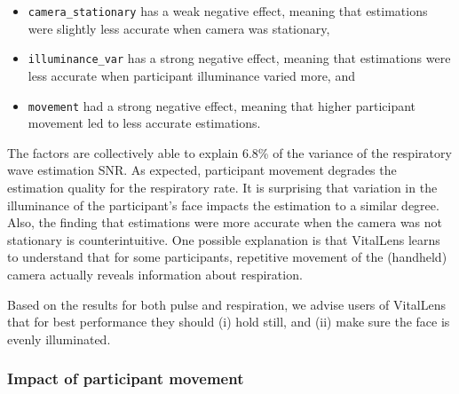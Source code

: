 \documentclass{article}
\begin{document}
\begin{itemize}
	\item \texttt{camera\_stationary} has a weak negative effect, meaning that estimations were slightly less accurate when camera was stationary,
	\item \texttt{illuminance\_var} has a strong negative effect, meaning that estimations were less accurate when participant illuminance varied more, and
	\item \texttt{movement} had a strong negative effect, meaning that higher participant movement led to less accurate estimations.
\end{itemize}

The factors are collectively able to explain 6.8\% of the variance of the respiratory wave estimation SNR.
As expected, participant movement degrades the estimation quality for the respiratory rate.
It is surprising that variation in the illuminance of the participant's face impacts the estimation to a similar degree.
Also, the finding that estimations were more accurate when the camera was not stationary is counterintuitive.
One possible explanation is that VitalLens learns to understand that for some participants, repetitive movement of the (handheld) camera actually reveals information about respiration.

Based on the results for both pulse and respiration, we advise users of VitalLens that for best performance they should (i) hold still, and (ii) make sure the face is evenly illuminated.

\subsubsection{Impact of participant movement}

\datatable
\end{document}
